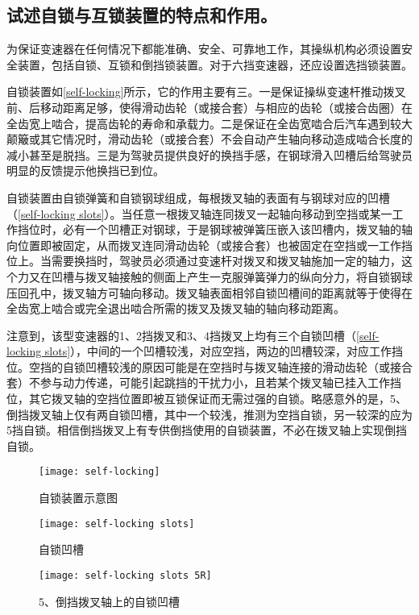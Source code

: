 \documentclass[UTF8]{ctexart}
\numberwithin{figure}{section}
\numberwithin{table}{section}
\begin{document}
\subsection{试述自锁与互锁装置的特点和作用。}

为保证变速器在任何情况下都能准确、安全、可靠地工作，其操纵机构必须设置安全装置，包括自锁、互锁和倒挡锁装置。对于六挡变速器，还应设置选挡锁装置。

自锁装置如\cref{self-locking}所示，它的作用主要有三。一是保证操纵变速杆推动拨叉前、后移动距离足够，使得滑动齿轮（或接合套）与相应的齿轮（或接合齿圈）在全齿宽上啮合，提高齿轮的寿命和承载力。二是保证在全齿宽啮合后汽车遇到较大颠簸或其它情况时，滑动齿轮（或接合套）不会自动产生轴向移动造成啮合长度的减小甚至是脱挡。三是为驾驶员提供良好的换挡手感，在钢球滑入凹槽后给驾驶员明显的反馈提示他换挡已到位。

自锁装置由自锁弹簧和自锁钢球组成，每根拨叉轴的表面有与钢球对应的凹槽（\cref{self-locking slots}）。当任意一根拨叉轴连同拨叉一起轴向移动到空挡或某一工作挡位时，必有一个凹槽正对钢球，于是钢球被弹簧压嵌入该凹槽内，拨叉轴的轴向位置即被固定，从而拨叉连同滑动齿轮（或接合套）也被固定在空挡或一工作挡位上。当需要换挡时，驾驶员必须通过变速杆对拨叉和拨叉轴施加一定的轴力，这个力又在凹槽与拨叉轴接触的侧面上产生一克服弹簧弹力的纵向分力，将自锁钢球压回孔中，拨叉轴方可轴向移动。拨叉轴表面相邻自锁凹槽间的距离就等于使得在全齿宽上啮合或完全退出啮合所需的拨叉及拨叉轴的轴向移动距离。

注意到，该型变速器的1、2挡拨叉和3、4挡拨叉上均有三个自锁凹槽（\cref{self-locking slots}），中间的一个凹槽较浅，对应空挡，两边的凹槽较深，对应工作挡位。空挡的自锁凹槽较浅的原因可能是在空挡时与拨叉轴连接的滑动齿轮（或接合套）不参与动力传递，可能引起跳挡的干扰力小，且若某个拨叉轴已挂入工作挡位，其它拨叉轴的空挡位置即被互锁保证而无需过强的自锁。略感意外的是，5、倒挡拨叉轴上仅有两自锁凹槽，其中一个较浅，推测为空挡自锁，另一较深的应为5挡自锁。相信倒挡拨叉上有专供倒挡使用的自锁装置，不必在拨叉轴上实现倒挡自锁。

\begin{figure}[htbp]
	\centering
	\begin{minipage}[b]{0.6\textwidth}
		\centering
		\texttt{[image: self-locking]}
		\caption{自锁装置示意图}
		\label{self-locking}
	\end{minipage}
	\centering
	\begin{minipage}[b]{0.35\textwidth}
		\centering
		\texttt{[image: self-locking slots]}
		\caption{自锁凹槽}
		\label{self-locking slots}
	\end{minipage}
	\begin{minipage}[b]{0.5\textwidth}
		\centering
		\texttt{[image: self-locking slots 5R]}
		\caption{5、倒挡拨叉轴上的自锁凹槽}
		\label{self-locking slots 5R}
	\end{minipage}
\end{figure}
\end{document}
